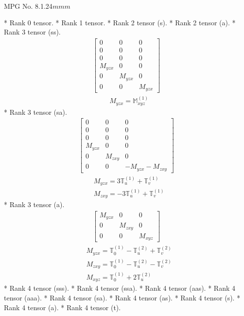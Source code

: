 \documentclass[fleqn,8pt,landscape]{jsarticle}
\begin{document}
\setcounter{MaxMatrixCols}{32}

\renewcommand{\tablename}{Table~}
\renewcommand{\figurename}{Figure~}
\begin{center}
\LARGE
MPG No. 8.1.24\quad$mmm$
\end{center}
* Rank 0 tensor.
* Rank 1 tensor.
* Rank 2 tensor (s).
* Rank 2 tensor (a).
* Rank 3 tensor (ss).
\begin{align*}
\begin{bmatrix} 0 & 0 & 0 \\ 0 & 0 & 0 \\ 0 & 0 & 0 \\ M_{yzx} & 0 & 0 \\ 0 & M_{yzx} & 0 \\ 0 & 0 & M_{yzx} \end{bmatrix}
\end{align*}
\begin{align*}
& M_{yzx} = \mathbb{M}_{xyz}^{(1)}
\end{align*}
* Rank 3 tensor (sa).
\begin{align*}
\begin{bmatrix} 0 & 0 & 0 \\ 0 & 0 & 0 \\ 0 & 0 & 0 \\ M_{yzx} & 0 & 0 \\ 0 & M_{zxy} & 0 \\ 0 & 0 & - M_{yzx} - M_{zxy} \end{bmatrix}
\end{align*}
\begin{align*}
& M_{yzx} = 3 \mathbb{T}_{u}^{(1)} + \mathbb{T}_{v}^{(1)} \\
& M_{zxy} = - 3 \mathbb{T}_{u}^{(1)} + \mathbb{T}_{v}^{(1)}
\end{align*}
* Rank 3 tensor (a).
\begin{align*}
\begin{bmatrix} M_{yzx} & 0 & 0 \\ 0 & M_{zxy} & 0 \\ 0 & 0 & M_{xyz} \end{bmatrix}
\end{align*}
\begin{align*}
& M_{yzx} = \mathbb{T}_{0}^{(1)} - \mathbb{T}_{u}^{(2)} + \mathbb{T}_{v}^{(2)} \\
& M_{zxy} = \mathbb{T}_{0}^{(1)} - \mathbb{T}_{u}^{(2)} - \mathbb{T}_{v}^{(2)} \\
& M_{xyz} = \mathbb{T}_{0}^{(1)} + 2 \mathbb{T}_{u}^{(2)}
\end{align*}
* Rank 4 tensor (sss).
* Rank 4 tensor (ssa).
* Rank 4 tensor (aas).
* Rank 4 tensor (aaa).
* Rank 4 tensor (sa).
* Rank 4 tensor (as).
* Rank 4 tensor (s).
* Rank 4 tensor (a).
* Rank 4 tensor (t).
\end{document}
